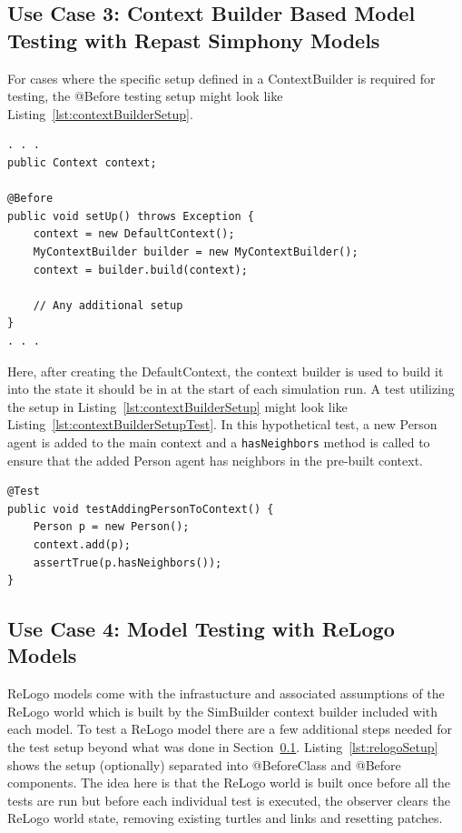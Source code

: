 \documentclass[11pt]{amsart}
\begin{document}
\subsection{Use Case 3: Context Builder Based Model Testing with Repast Simphony Models}
\label{sec:use3}
For cases where the specific setup defined in a ContextBuilder is required for testing, the @Before testing setup might look like Listing~\ref{lst:contextBuilderSetup}.

\noindent\begin{minipage}[h]{\textwidth}
\vspace{.2in}
\lstset{language=java,caption=@Before setup method in a context builder dependent test case.,label=lst:contextBuilderSetup}
\begin{lstlisting}
. . .
public Context context;

@Before
public void setUp() throws Exception {
	context = new DefaultContext();
	MyContextBuilder builder = new MyContextBuilder();
	context = builder.build(context);
	
	// Any additional setup
}
. . .
\end{lstlisting}
\vspace{.2in}
\end{minipage}
Here, after creating the DefaultContext, the context builder is used to build it into the state it should be in at the start of each simulation run. A test utilizing the setup in Listing~\ref{lst:contextBuilderSetup} might look like Listing~\ref{lst:contextBuilderSetupTest}. In this hypothetical test, a new Person agent is added to the main context and a \texttt{hasNeighbors} method is called to ensure that the added Person agent has neighbors in the pre-built context.

\noindent\begin{minipage}[h]{\textwidth}
\vspace{.2in}
\lstset{language=java,caption=Example test method where the context state created by a context builder is used.,label=lst:contextBuilderSetupTest}
\begin{lstlisting}
@Test
public void testAddingPersonToContext() {
	Person p = new Person();
	context.add(p);
	assertTrue(p.hasNeighbors());
}
\end{lstlisting}
\vspace{.2in}
\end{minipage}


\subsection{Use Case 4: Model Testing with ReLogo Models}
ReLogo models come with the infrastucture and associated assumptions of the ReLogo world which is built by the SimBuilder context builder included with each model. To test a ReLogo model there are a few additional steps needed for the test setup beyond what was done in Section~\ref{sec:use3}. Listing~\ref{lst:relogoSetup} shows the setup (optionally) separated into @BeforeClass and @Before components. The idea here is that the ReLogo world is built once before all the tests are run but before each individual test is executed, the observer clears the ReLogo world state, removing existing turtles and links and resetting patches.
\end{document}
